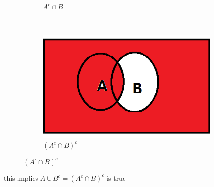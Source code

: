 \documentclass[a4paper,11pt]{article}
\begin{document}
\begin{figure}[hb]
\begin{subfigure}[b]{0.25\textwidth}
        \caption{$A^c\cap B$}
        \label{fig:mouse}
    \end{subfigure}
 ~
    \begin{subfigure}[b]{0.25\textwidth}
        \includegraphics[width=\textwidth]{AcnBc}
        \caption{$(A^c \cap B)^c$}
        \label{fig:mouse}
    \end{subfigure}
\end{figure}
this implies $A \cup B^c = (A^c\cap B)^c$ is true
\end{document}
